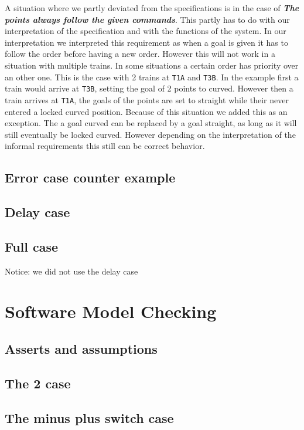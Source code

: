 \documentclass[a4paper]{article}
\begin{document}
	A situation where we partly deviated from the specifications is in the case of \textit{\textbf{The points always follow the given commands}}. This partly has to do with our interpretation of the specification and with the functions of the system. In our interpretation we interpreted this requirement as when a goal is given it has to follow the order before having a new order. However this will not work in a situation with multiple trains. In some situations a certain order has priority over an other one. This is the case with 2 trains at \texttt{T1A} and \texttt{T3B}. In the example first a train would arrive at \texttt{T3B}, setting the goal of 2 points to curved. However then a train arrives at \texttt{T1A}, the goals of the points are set to straight while their never entered a locked curved position.
	Because of this situation we added this as an exception. The a goal curved can be replaced by a goal straight, as long as it will still eventually be locked curved. However depending on the interpretation of the informal requirements this still can be correct behavior.
	
	\subsection{Error case counter example}
	
	
	\subsection{Delay case}
	
	
	\subsection{Full case}
	Notice: we did not use the delay case
	

	\section{Software Model Checking}


	\subsection{Asserts and assumptions}
	
	
	\subsection{The 2 case}
	
	
	\subsection{The minus plus switch case}
	
	
	
\end{document}
